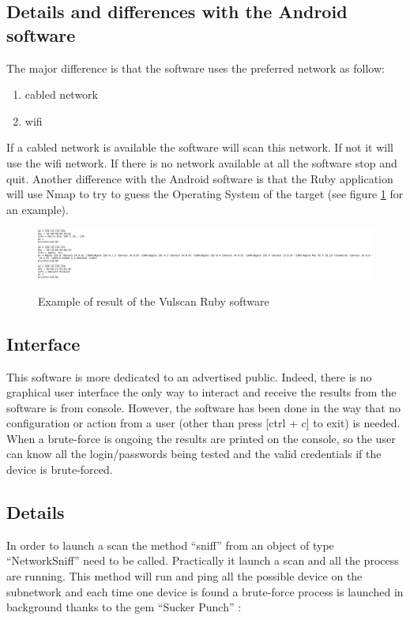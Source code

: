 \documentclass{report}
\begin{document}
\subsection{Details and differences with the Android software}
The major difference is that the software uses the preferred network as follow:
\begin{enumerate}
 \item cabled network
 \item wifi
\end{enumerate}
If a cabled network is available the software will scan this network. If not it will use the wifi network. If there is no network available at all the software stop and quit.\newline
Another difference with the Android software is that the Ruby application will use Nmap to try to guess the Operating System of the target (see figure \ref{fig:result-os} for an example).
\begin{figure}
 \caption{Example of result of the Vulscan Ruby software}
 \centering
 \includegraphics[width=1.2\textwidth]{./img/result-os}
 \label{fig:result-os}
\end{figure}

\subsection{Interface}
This software is more dedicated to an advertised public. Indeed, there is no graphical user interface the only way to interact and receive the results from the software is from console. However, the software has been done in the way that no configuration or action from a user (other than press {[}ctrl + c{]} to exit) is needed. When a brute-force is ongoing the results are printed on the console, so the user can know all the login/passwords being tested and the valid credentials if the device is brute-forced.

\subsection{Details}
In order to launch a scan the method ``sniff'' from an object of type ``NetworkSniff'' need to be called. Practically it launch a scan and all the process are running. This method will run and ping all the possible device on the subnetwork and each time one device is found a brute-force process is launched in background thanks to the gem ``Sucker Punch'' \autocite{suckerpunch}:
\end{document}
